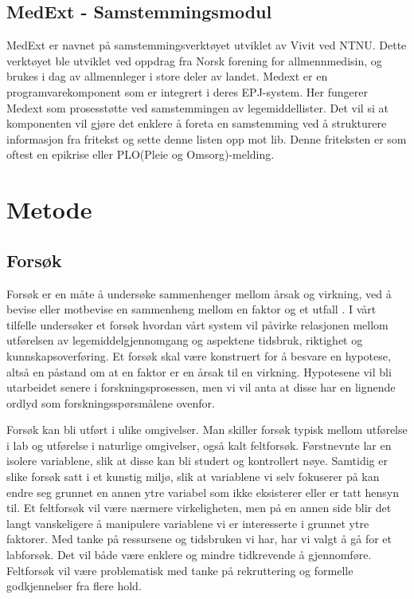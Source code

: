 \subsection{MedExt - Samstemmingsmodul}
MedExt er navnet på samstemmingsverktøyet utviklet av Vivit ved NTNU. Dette verktøyet ble utviklet ved oppdrag fra Norsk forening for allmennmedisin, og brukes i dag av allmennleger i store deler av landet. Medext er en programvarekomponent som er integrert i deres EPJ-system. Her fungerer Medext som prosesstøtte ved samstemmingen av legemiddellister. Det vil si at komponenten vil gjøre det enklere å foreta en samstemming ved å strukturere informasjon fra fritekst og sette denne listen opp mot \gls{lib}. Denne friteksten er som oftest en epikrise eller PLO(Pleie og Omsorg)-melding.



\section{Metode}
\subsection{Forsøk}
Forsøk er en måte å undersøke sammenhenger mellom årsak og virkning, ved å bevise eller motbevise en sammenheng mellom en faktor og et utfall \citep[s.126-127]{Researching_is}. I vårt tilfelle undersøker et forsøk hvordan vårt system vil påvirke relasjonen mellom utførelsen av legemiddelgjennomgang og aspektene tidsbruk, riktighet og kunnskapsoverføring. Et forsøk skal være konstruert for å besvare en hypotese, altså en påstand om at en faktor er en årsak til en virkning. Hypotesene vil bli utarbeidet senere i forskningsprosessen, men vi vil anta at disse har en lignende ordlyd som forskningsspørsmålene ovenfor.    

Forsøk kan bli utført i ulike omgivelser. Man skiller forsøk typisk mellom utførelse i lab og utførelse i naturlige omgivelser, også kalt feltforsøk. Førstnevnte lar en isolere variablene, slik at disse kan bli studert og kontrollert nøye. Samtidig er slike forsøk satt i et kunstig miljø, slik at variablene vi selv fokuserer på kan endre seg grunnet en annen ytre variabel som ikke eksisterer eller er tatt hensyn til. Et feltforsøk vil være nærmere virkeligheten, men på en annen side blir det langt vanskeligere å manipulere variablene vi er interesserte i grunnet ytre faktorer. Med tanke på ressursene og tidsbruken vi har, har vi valgt å gå for et labforsøk. Det vil både være enklere og mindre tidkrevende å gjennomføre. Feltforsøk vil være problematisk med tanke på rekruttering og formelle godkjennelser fra flere hold.  

